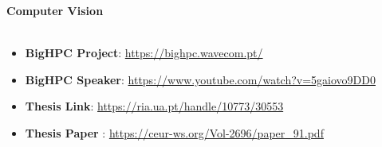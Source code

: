 \documentclass[10pt,a4paper,ragged2e,withhyper]{altacv}
\begin{document}
\begin{paracol}{2}
      \textbf{Computer Vision}\\
      \medskip
      \\

      \begin{itemize}
            \item \textbf{BigHPC Project}: \url{https://bighpc.wavecom.pt/}
            \item \textbf{BigHPC Speaker}: \url{https://www.youtube.com/watch?v=5gaiovo9DD0}
            \item \textbf{Thesis Link}: \url{https://ria.ua.pt/handle/10773/30553}
            \item \textbf{Thesis Paper }: \url{https://ceur-ws.org/Vol-2696/paper_91.pdf}
      \end{itemize}

\end{paracol}
\end{document}
